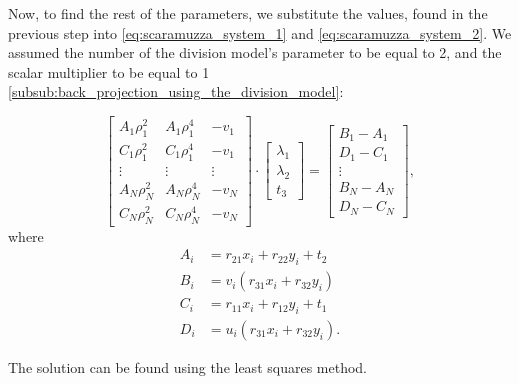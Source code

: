 \documentclass[
  twocolumn,
]{article} %
\begin{document}
Now, to find the rest of the parameters, we substitute the values, found in the
previous step into \cref{eq:scaramuzza_system_1} and
\cref{eq:scaramuzza_system_2}. We assumed the number of the division model's
parameter to be equal to 2, and the scalar multiplier to be equal to 1
\cref{subsub:back_projection_using_the_division_model}:

\begin{equation}
	\begin{bmatrix}
		A_1 \rho_1^{2} & A_1 \rho_1^{4} & -v_1   \\
		C_1 \rho_1^{2} & C_1 \rho_1^{4} & -v_1   \\
		\vdots         & \vdots         & \vdots \\
		A_N \rho_N^{2} & A_N \rho_N^{4} & -v_N   \\
		C_N \rho_N^{2} & C_N \rho_N^{4} & -v_N
	\end{bmatrix} \cdot \begin{bmatrix}
		\lambda_1 \\
		\lambda_2 \\
		t_3
	\end{bmatrix} = \begin{bmatrix}
		B_1 - A_1 \\
		D_1 - C_1 \\
		\vdots    \\
		B_N - A_N \\
		D_N - C_N
	\end{bmatrix},
\end{equation}
where
\begin{align}
	A_i & = r_{21} x_i + r_{22} y_i + t_2  \\
	B_i & = v_i (r_{31} x_i + r_{32} y_i)  \\
	C_i & = r_{11} x_i + r_{12} y_i + t_1  \\
	D_i & = u_i (r_{31} x_i + r_{32} y_i).
\end{align}

The solution can be found using the least squares method.
\end{document}
